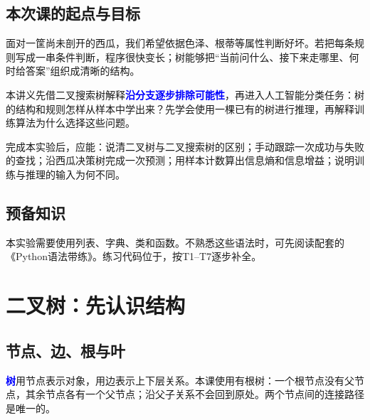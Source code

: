 \documentclass[UTF8,a4paper,11pt,fontset=fandol]{ctexart}
\numberwithin{equation}{subsection}
\newcommand{\term}[1]{\textcolor{Blue}{\textbf{#1}}}
\begin{document}
\subsection{本次课的起点与目标}
面对一筐尚未剖开的西瓜，我们希望依据色泽、根蒂等属性判断好坏。若把每条规则写成一串条件判断，程序很快变长；树能够把“当前问什么、接下来走哪里、何时给答案”组织成清晰的结构。

本讲义先借二叉搜索树解释\term{沿分支逐步排除可能性}，再进入人工智能分类任务：树的结构和规则怎样从样本中学出来？先学会使用一棵已有的树进行推理，再解释训练算法为什么选择这些问题。

\begin{keybox}[学习目标]
完成本实验后，应能：说清二叉树与二叉搜索树的区别；手动跟踪一次成功与失败的查找；沿西瓜决策树完成一次预测；用样本计数算出信息熵和信息增益；说明训练与推理的输入为何不同。
\end{keybox}

\subsection{预备知识}
本实验需要使用列表、字典、类和函数。不熟悉这些语法时，可先阅读配套的《Python语法带练》。练习代码位于，按T1--T7逐步补全。

\section{二叉树：先认识结构}
\subsection{节点、边、根与叶}
\term{树}用节点表示对象，用边表示上下层关系。本课使用有根树：一个根节点没有父节点，其余节点各有一个父节点；沿父子关系不会回到原处。两个节点间的连接路径是唯一的。
\end{document}
